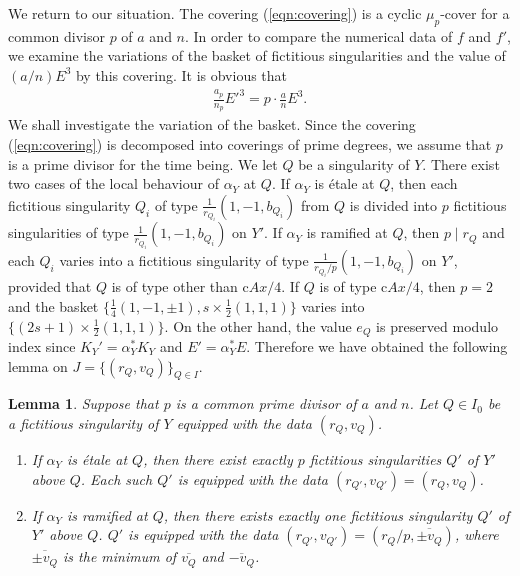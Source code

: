 \documentclass[a4paper,11pt]{amsart}
\newtheorem{lemma}[theorem]{Lemma}
\theoremstyle{definition}
\theoremstyle{remark}
\numberwithin{equation}{section}
\begin{document}
We return to our situation.
The covering (\ref{eqn:covering}) is a cyclic $\mu_p$-cover for
a common divisor $p$ of $a$ and $n$.
In order to compare the numerical data of $f$ and $f'$,
we examine the variations of
the basket of fictitious singularities and the value of $(a/n)E^3$
by this covering.
It is obvious that
\begin{align}\label{eqn:variation}
\frac{a_p}{n_p}{E'}^3=p\cdot\frac{a}{n}E^3.
\end{align}
We shall investigate the variation of the basket.
Since the covering (\ref{eqn:covering}) is decomposed into
coverings of prime degrees,
we assume that $p$ is a prime divisor for the time being.
We let $Q$ be a singularity of $Y$.
There exist two cases of the local behaviour of $\alpha_Y$ at $Q$.
If $\alpha_Y$ is \'etale at $Q$,
then each fictitious singularity
$Q_i$ of type $\frac{1}{r_{Q_i}}(1,-1,b_{Q_i})$ from $Q$
is divided into $p$ fictitious singularities
of type $\frac{1}{r_{Q_i}}(1,-1,b_{Q_i})$ on $Y'$.
If $\alpha_Y$ is ramified at $Q$,
then $p \mid r_Q$ and
each $Q_i$ varies into a fictitious singularity
of type $\frac{1}{r_{Q_i}/p}(1,-1,b_{Q_i})$ on $Y'$,
provided that $Q$ is of type other than c$Ax/4$.
If $Q$ is of type c$Ax/4$,
then $p=2$ and the basket
$\{\frac{1}{4}(1,-1,\pm1),s\times\frac{1}{2}(1,1,1)\}$
varies into $\{(2s+1)\times\frac{1}{2}(1,1,1)\}$.
On the other hand,
the value $e_Q$ is preserved modulo index
since $K_Y'=\alpha_Y^*K_Y$ and $E'=\alpha_Y^*E$.
Therefore we have obtained the following lemma on $J=\{(r_Q,v_Q)\}_{Q\in I}$.

\begin{lemma}\label{lem:variation}
Suppose that $p$ is a common prime divisor of $a$ and $n$.
Let $Q \in I_0$ be a fictitious singularity of $Y$
equipped with the data $(r_Q, v_Q)$.
\begin{enumerate}
\item\label{itm:variation_etale}
If $\alpha_Y$ is \'etale at $Q$,
then there exist exactly $p$ fictitious singularities $Q'$ of $Y'$ above $Q$.
Each such $Q'$ is equipped with the data $(r_{Q'},v_{Q'})=(r_Q,v_Q)$.
\item\label{itm:variation_ramified}
If $\alpha_Y$ is ramified at $Q$,
then there exists exactly one fictitious singularity $Q'$ of $Y'$ above $Q$.
$Q'$ is equipped with the data $(r_{Q'},v_{Q'})=(r_Q/p,\overline{\pm v_Q})$,
where $\overline{\pm v_Q}$ is
the minimum of $\overline{v_Q}$ and $\overline{-v_Q}$.
\end{enumerate}
\end{lemma}
\end{document}
